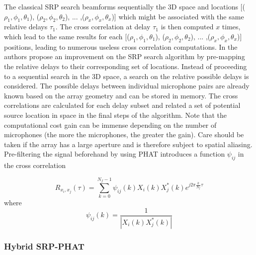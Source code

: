 
The classical SRP search beamforms sequentially the 3D space and locations [($\rho_{1},\phi_{1},\theta_{1}$), ($\rho_{2},\phi_{2},\theta_{2}$), ... ,($\rho_{x},\phi_{x},\theta_{x}$)] which might be associated with the same relative delays $\tau_{1}$. The cross correlation at delay $\tau_{1}$ is then computed $x$ times, which lead to the same results for each [($\rho_{1},\phi_{1},\theta_{1}$), ($\rho_{2},\phi_{2},\theta_{2}$), ... ,($\rho_{x},\phi_{x},\theta_{x}$)] positions, leading to numerous useless cross correlation computations. In \cite{dmochowski2007generalized} the authors propose an improvement on the SRP search algorithm by pre-mapping the relative delays to their corresponding set of locations. Instead of proceeding to a sequential search in the 3D space, a search on the relative possible delays is considered. The possible delays between individual microphone pairs are already known based on the array geometry and can be stored in memory. The cross correlations are calculated for each delay subset and related a set of potential source location in space in the final steps of the algorithm. Note that the computational cost gain can be immense depending on the number of microphones (the more the microphones, the greater the gain). Care should be taken if the array has a large aperture and is therefore subject to spatial aliasing. Pre-filtering the signal beforehand by using PHAT introduces a function $\psi_{ij}$ in the cross correlation

\begin{equation}
    R_{x_i,x_j}(\tau)= \sum\limits_{k=0}^{N_{f}-1}{\psi_{ij}(k) X_{i}(k)X_{j}^*(k)e^{j2\pi\frac{k}{N_{f}}\tau}}
\end{equation}
where
\begin{equation}
    \psi_{ij}(k) = \frac{1}{|{X_{i}(k)X_{j}^*(k)}|}
\end{equation}

\subsubsection{Hybrid SRP-PHAT}

